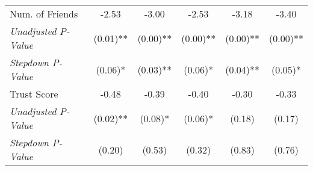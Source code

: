 \begin{tabular}{l c c c c c}
Num. of Friends & -2.53 & -3.00 & -2.53 & -3.18 & -3.40 \\
\quad \textit{Unadjusted P-Value} & (0.01)** & (0.00)** & (0.00)** & (0.00)** & (0.00)** \\
\quad \textit{Stepdown P-Value} & (0.06)* & (0.03)** & (0.06)* & (0.04)** & (0.05)* \\
Trust Score & -0.48 & -0.39 & -0.40 & -0.30 & -0.33 \\
\quad \textit{Unadjusted P-Value} & (0.02)** & (0.08)* & (0.06)* & (0.18) & (0.17) \\
\quad \textit{Stepdown P-Value} & (0.20) & (0.53) & (0.32) & (0.83) & (0.76) \\
\bottomrule
\end{tabular}
